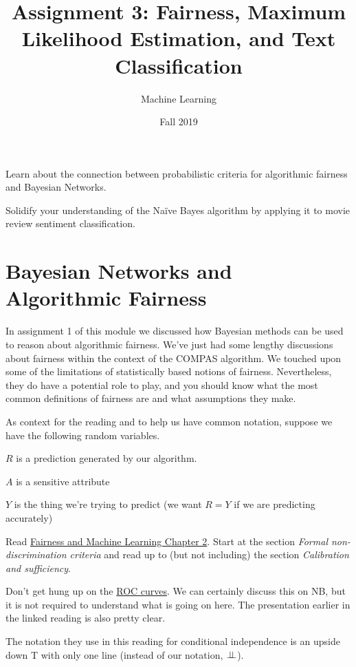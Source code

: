 \documentclass[assignment03_Solutions]{subfiles}
\title{Assignment 3: Fairness, Maximum Likelihood Estimation, and Text Classification}
\author{Machine Learning}
\date{Fall 2019}
\begin{document}
\maketitle
\thispagestyle{firstpage}


\begin{learningobjectives}
\bi
\item Learn about the connection between probabilistic criteria for algorithmic fairness and Bayesian Networks.
\item Solidify your understanding of the Na\"ive Bayes algorithm by applying it to movie review sentiment classification.
\ei
\end{learningobjectives}

\section{Bayesian Networks and Algorithmic Fairness}


In assignment 1 of this module we discussed how Bayesian methods can be used to reason about algorithmic fairness.  We've just had some lengthy discussions about fairness within the context of the COMPAS algorithm.  We touched upon some of the limitations of statistically based notions of fairness.  Nevertheless, they do have a potential role to play, and you should know what the most common definitions of fairness are and what assumptions they make.

As context for the reading and to help us have common notation, suppose we have the following random variables.

\bi
\item $R$ is a prediction generated by our algorithm.
\item $A$ is a sensitive attribute
\item $Y$ is the thing we're trying to predict (we want $R = Y$ if we are predicting accurately)
\ei

\begin{externalresources}[(40 minutes)]
Read \href{https://fairmlbook.org/classification.html}{Fairness and Machine Learning Chapter 2}.  Start at the section \emph{Formal non-discrimination criteria} and read up to (but not including) the section \emph{Calibration and sufficiency}.
\begin{notice}
\bi
\item Don't get hung up on the \href{https://en.wikipedia.org/wiki/Receiver_operating_characteristic}{ROC curves}.  We can certainly discuss this on NB, but it is not required to understand what is going on here.  The presentation earlier in the linked reading is also pretty clear.
\item The notation they use in this reading for conditional independence is an upside down T with only one line (instead of our notation, $\perp\!\!\!\perp$).
\ei
\end{notice}
\end{externalresources}
\end{document}
